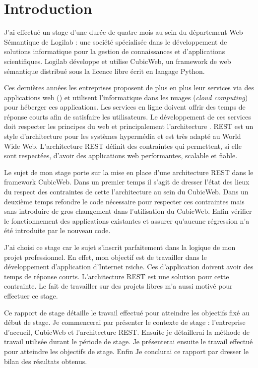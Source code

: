 \chapter*{Introduction}
J'ai effectué un stage d'une durée de quatre mois au sein du département Web Sémantique de Logilab : une société spécialisée dans le développement de solutions informatique pour la gestion de connaissances et d'applications scientifiques. Logilab développe et utilise CubicWeb, un framework de web sémantique distribué sous la licence libre  écrit en langage Python. 

Ces dernières années les entreprises proposent de plus en plus leur services via des applications web (\textit{}) et utilisent l'informatique dans les nuages (\textit{cloud computing}) pour héberger ces applications. Les services en ligne doivent offrir des temps de réponse courts afin de satisfaire les utilisateurs. Le développement de ces services doit respecter les principes du web et principalement l'architecture . REST est un style d'architecture pour les systèmes hypermédia et est très adapté au World Wide Web. L'architecture REST définit des contraintes qui permettent, si elle sont respectées, d'avoir des applications web performantes, scalable et fiable.

Le sujet de mon stage porte sur la mise en place d'une architecture REST dans le framework CubicWeb. Dans un premier temps il s'agit de dresser l'état des lieux du respect des contraintes de cette l'architecture au sein du CubicWeb. Dans un deuxième temps refondre le code nécessaire pour respecter ces contraintes mais sans introduire de gros changement dans l'utilisation du CubicWeb. Enfin vérifier le fonctionnement des applications existantes et assurer qu'aucune régression n'a été introduite par le nouveau code.

J'ai choisi ce stage car le sujet s'inscrit parfaitement dans la logique de mon projet professionnel. En effet, mon objectif est de travailler dans le développement d'application d'Internet rsiche. Ces d'application doivent avoir des temps de réponse courts. L'architecture REST est une solution pour cette contrainte. Le fait de travailler sur des projets libres m'a aussi motivé pour effectuer ce stage.

Ce rapport de stage détaille le travail effectué pour atteindre les objectifs fixé au début de stage. Je commencerai par présenter le contexte de stage : l'entreprise d'accueil, CubicWeb et l'architecture REST. Ensuite je détaillerai la méthode de travail utilisée durant le période de stage. Je présenterai ensuite le travail effectué pour atteindre les objectifs de stage. Enfin Je conclurai ce rapport par dresser le bilan des résultats obtenus.